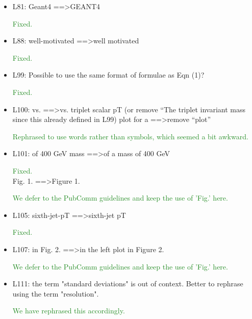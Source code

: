 \documentclass[paper=a4, fontsize=11pt]{scrartcl}
\begin{document}
\begin{itemize}
\item L81: 
Geant4 ==\textgreater GEANT4 

\textcolor{ForestGreen}{Fixed.}\\


\item L88: 
well-motivated ==\textgreater well motivated 

\textcolor{ForestGreen}{Fixed.}\\


\item L99: 
Possible to use the same format of formulae as Eqn (1)? 

\textcolor{ForestGreen}{Fixed.}\\


\item L100: 
vs. ==\textgreater vs. triplet scalar pT (or remove “The triplet invariant mass since 
this already defined in L99) 
plot for a ==\textgreater remove “plot” 

\textcolor{ForestGreen}{Rephrased to use words rather than symbols, which seemed a bit awkward.}\\


\item L101: 
of 400 GeV mass ==\textgreater of a mass of 400 GeV 

\textcolor{ForestGreen}{Fixed.}\\


Fig. 1. ==\textgreater Figure 1. 

\textcolor{ForestGreen}{We defer to the PubComm guidelines and keep the use of 'Fig.' here.}\\


\item L105: 
sixth-jet-pT ==\textgreater sixth-jet pT 

\textcolor{ForestGreen}{Fixed.}\\

\item L107: 
in Fig. 2. ==\textgreater in the left plot in Figure 2. 

\textcolor{ForestGreen}{We defer to the PubComm guidelines and keep the use of 'Fig.' here.}\\


\item L111: 
the term "standard deviations" is out of context. Better to rephrase using 
the term "resolution". 

\textcolor{ForestGreen}{We have rephrased this accordingly.}\\


\end{itemize}
\end{document}
